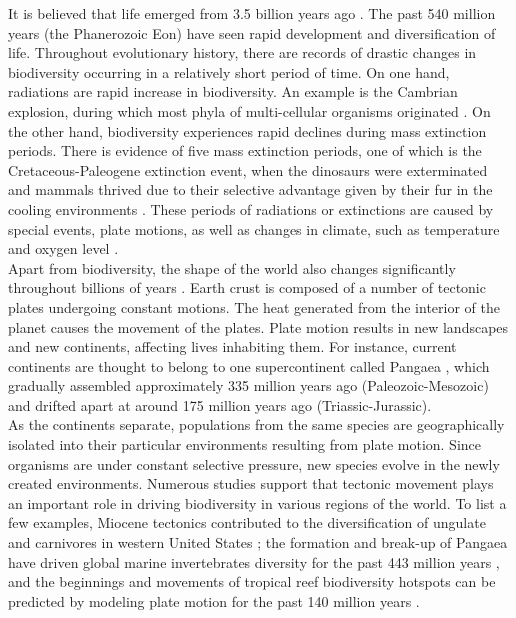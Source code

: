 \documentclass[11pt, a4paper,oneside,chapterprefix=false]{scrbook}
\begin{document}
It is believed that life emerged from 3.5 billion years ago \cite{algeo1998terrestrial}. The past 540 million years (the Phanerozoic Eon) have seen rapid development and diversification of life. Throughout evolutionary history, there are records of drastic changes in biodiversity occurring in a relatively short period of time. On one hand, radiations are rapid increase in biodiversity. An example is the Cambrian explosion, during which most phyla of multi-cellular organisms originated \cite{alroy2001effects}. On the other hand, biodiversity experiences rapid declines during mass extinction periods. There is evidence of five mass extinction periods, one of which is the Cretaceous-Paleogene extinction event, when the dinosaurs were exterminated and mammals thrived due to their selective advantage given by their fur in the cooling environments \cite{courtillot2002evolutionary}. These periods of radiations or extinctions are caused by special events, plate motions, as well as changes in climate, such as temperature and oxygen level \cite{butterfield2009oxygen, svenning2007ice}. \\

Apart from biodiversity, the shape of the world also changes significantly throughout billions of years \cite{wilson1963continental}. Earth crust is composed of a number of tectonic plates undergoing constant motions. The heat generated from the interior of the planet causes the movement of the plates. Plate motion results in new landscapes and new continents, affecting lives inhabiting them. For instance, current continents are thought to belong to one supercontinent called Pangaea \cite{stampfli2013formation}, which gradually assembled approximately 335 million years ago (Paleozoic-Mesozoic) and drifted apart at around 175 million years ago (Triassic-Jurassic). \\

As the continents separate, populations from the same species are geographically isolated into their particular environments resulting from plate motion. Since organisms are under constant selective pressure, new species evolve in the newly created environments. Numerous studies support that tectonic movement plays an important role in driving biodiversity in various regions of the world. To list a few examples, Miocene tectonics contributed to the diversification of ungulate and carnivores in western United States \cite{kohn2008miocene}; the formation and break-up of Pangaea have driven global marine invertebrates diversity for the past 443 million years \cite{zaffos2017plate}, and the beginnings and movements of tropical reef biodiversity hotspots can be predicted by modeling plate motion for the past 140 million years \cite{leprieur2016plate}. 
\end{document}
